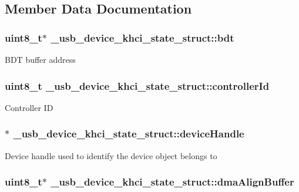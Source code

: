 \subsection{Member Data Documentation}
\hypertarget{struct__usb__device__khci__state__struct_ae5697fe1b2ccad39c0a166ab56de318a}{
\subsubsection[{bdt}]{\setlength{\rightskip}{0pt plus 5cm}uint8\-\_\-t$\ast$ \-\_\-usb\-\_\-device\-\_\-khci\-\_\-state\-\_\-struct\-::bdt}}\label{struct__usb__device__khci__state__struct_ae5697fe1b2ccad39c0a166ab56de318a}
B\-D\-T buffer address \hypertarget{struct__usb__device__khci__state__struct_a4301d1c84230578464dc8e625d3db82f}{
\subsubsection[{controller\-Id}]{\setlength{\rightskip}{0pt plus 5cm}uint8\-\_\-t \-\_\-usb\-\_\-device\-\_\-khci\-\_\-state\-\_\-struct\-::controller\-Id}}\label{struct__usb__device__khci__state__struct_a4301d1c84230578464dc8e625d3db82f}
Controller I\-D \hypertarget{struct__usb__device__khci__state__struct_ad941a856f8322b5a041028018c6d801f}{
\subsubsection[{device\-Handle}]{$\ast$ \-\_\-usb\-\_\-device\-\_\-khci\-\_\-state\-\_\-struct\-::device\-Handle}}\label{struct__usb__device__khci__state__struct_ad941a856f8322b5a041028018c6d801f}
Device handle used to identify the device object belongs to \hypertarget{struct__usb__device__khci__state__struct_a572451afb27d66cfbcc459e9647c1f20}{
\subsubsection[{dma\-Align\-Buffer}]{\setlength{\rightskip}{0pt plus 5cm}uint8\-\_\-t$\ast$ \-\_\-usb\-\_\-device\-\_\-khci\-\_\-state\-\_\-struct\-::dma\-Align\-Buffer}}\label{struct__usb__device__khci__state__struct_a572451afb27d66cfbcc459e9647c1f20}

